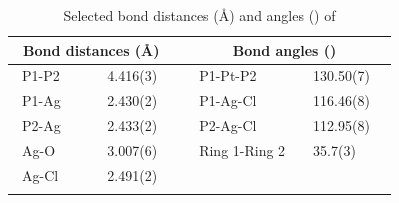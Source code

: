 \begin{table}[ht]
\caption[Selected bond distances (\AA) and angles (\degrees) of ]{Selected bond distances (\AA) and angles (\degrees) of } 
\vspace{1em}
\label{table:crystalthixantphossilverchloride:lengths}
\small
\begin{center}
\begin{tabular}{l l l l}
	\toprule
	\multicolumn{2}{l}{\bfseries{~Bond distances (\si{\angstrom})}} & \multicolumn{2}{c}{\bfseries{Bond angles (\degrees)}} \\
	\midrule		
	~P1-P2		~~&~~4.416(3)~~	&~~P1-Pt-P2			&~~130.50(7)~~	\\	
	~P1-Ag		~~&~~2.430(2)~~	&~~P1-Ag-Cl			&~~116.46(8)~~	\\
	~P2-Ag		~~&~~2.433(2)~~	&~~P2-Ag-Cl			&~~112.95(8)~~	\\
	~Ag-O		~~&~~3.007(6)~~	&~~Ring 1-Ring 2		&~~35.7(3)~~		\\
	~Ag-Cl		~~&~~2.491(2)~~	&~~					&~~		~~		\\
	\bottomrule{}
\end{tabular}
\end{center}
\end{table}

